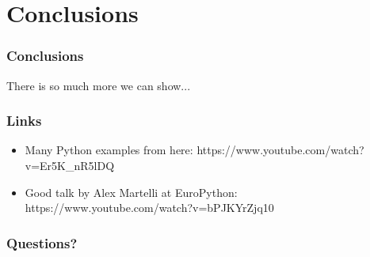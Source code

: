\documentclass{beamer}
\begin{document}
\section{Conclusions}
\begin{frame}
\frametitle{Conclusions}


There is so much more we can show...
 
\end{frame}

\begin{frame}
\frametitle{Links}

  \begin{itemize}
   \item Many Python examples from here: https://www.youtube.com/watch?v=Er5K\_nR5lDQ
   \item Good talk by Alex Martelli at EuroPython: https://www.youtube.com/watch?v=bPJKYrZjq10
  \end{itemize}

\end{frame}

 \begin{frame}
 \frametitle{Questions?}
 \begin{center}
 \end{center}
 \end{frame}
\end{document}
